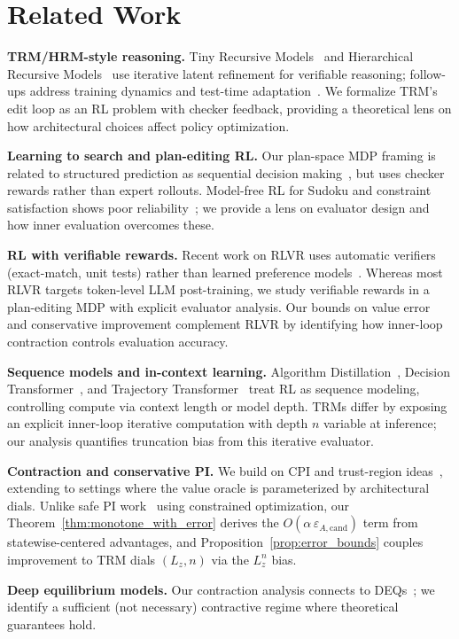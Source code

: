 \documentclass{article}
\theoremstyle{plain}
\theoremstyle{definition}
\theoremstyle{remark}
\newcommand{\shortonly}[1]{#1}
\newcommand{\shortonly}[1]{}
\begin{document}
\shortonly{
\section{Related Work}
\label{sec:related_work}

\textbf{TRM/HRM-style reasoning.}
Tiny Recursive Models~\citep{TRM2025} and Hierarchical Recursive Models~\citep{HRM2025} use iterative latent refinement for verifiable reasoning; follow-ups address training dynamics and test-time adaptation~\citep{Qasim2025CGAR,McGovern2025TRMAdapt}.
We formalize TRM's edit loop as an RL problem with checker feedback, providing a theoretical lens on how architectural choices affect policy optimization.

\textbf{Learning to search and plan-editing RL.}
Our plan-space MDP framing is related to structured prediction as sequential decision making~\citep{Daume2009SEARN,Ross2011DAgger,Chang2015LOLS}, but uses checker rewards rather than expert rollouts.
Model-free RL for Sudoku and constraint satisfaction shows poor reliability~\citep{Mehta2021SudokuRL,Klein2022SudokuRL}; we provide a lens on evaluator design and how inner evaluation overcomes these.

\textbf{RL with verifiable rewards.}
Recent work on RLVR uses automatic verifiers (exact-match, unit tests) rather than learned preference models~\citep{Wang2025OneShotRLVR,Su2025RewardBridge,DeepSeekR1}.
Whereas most RLVR targets token-level LLM post-training, we study verifiable rewards in a plan-editing MDP with explicit evaluator analysis.
Our bounds on value error and conservative improvement complement RLVR by identifying how inner-loop contraction controls evaluation accuracy.

\textbf{Sequence models and in-context learning.}
Algorithm Distillation~\citep{laskin2022context}, Decision Transformer~\citep{chen2021decision}, and Trajectory Transformer~\citep{janner2021trajectory} treat RL as sequence modeling, controlling compute via context length or model depth.
TRMs differ by exposing an explicit inner-loop iterative computation with depth $n$ variable at inference; our analysis quantifies truncation bias from this iterative evaluator.

\textbf{Contraction and conservative PI.}
We build on CPI and trust-region ideas~\citep{KakadeLangford2002,Schulman2015TRPO}, extending to settings where the value oracle is parameterized by architectural dials. Unlike safe PI work~\citep{Pirotta2013SafePI,Metelli2021SafePI,Eshwar2025MonotoneCPI} using constrained optimization, our Theorem~\ref{thm:monotone_with_error} derives the $O(\alpha\,\varepsilon_{A,\mathrm{cand}})$ term from statewise-centered advantages, and Proposition~\ref{prop:error_bounds} couples improvement to TRM dials $(L_z, n)$ via the $L_z^n$ bias.

\textbf{Deep equilibrium models.}
Our contraction analysis connects to DEQs~\citep{Bai2019DEQ}; we identify a sufficient (not necessary) contractive regime where theoretical guarantees hold.}
\end{document}
